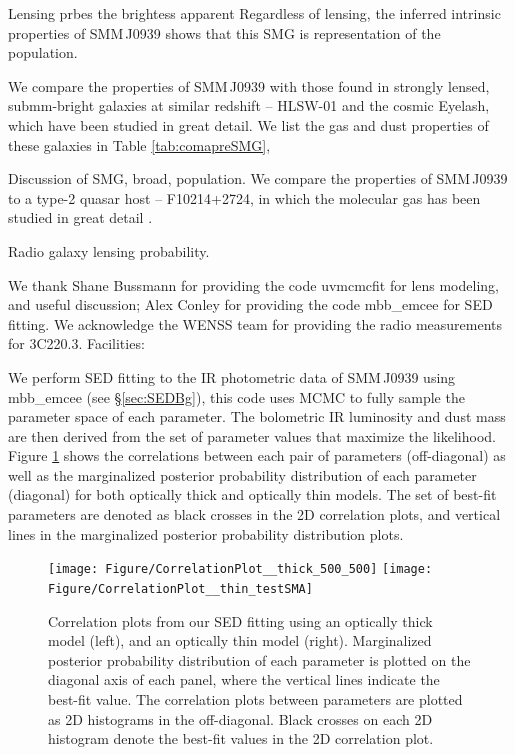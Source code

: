 \documentclass[twocolumn,apj,numberedappendix]{emulateapj}
\begin{document}
Lensing prbes the brightess apparent 
Regardless of lensing, the inferred intrinsic properties of SMM\,J0939 shows that this SMG is representation of the population.

We compare the properties of SMM\,J0939 with those found in strongly lensed, submm-bright galaxies at similar redshift -- HLSW-01 and the cosmic Eyelash, which have been studied in great detail. We list the gas and dust properties of these galaxies in Table \ref{tab:comapreSMG}, 


Discussion of SMG, broad, population.
We compare the properties of SMM\,J0939 to a type-2 quasar host -- F10214+2724, in which the molecular gas has been studied in great detail \citep{Riechers11a}.  

Radio galaxy lensing probability.

\acknowledgments
We thank Shane Bussmann for providing the code {\sc uvmcmcfit} for lens modeling, and useful discussion; Alex Conley for providing the code {\sc mbb\_emcee} for SED fitting. We acknowledge the WENSS team for providing the radio measurements for 3C220.3. 
Facilities: 




\appendix

We perform SED fitting to the IR photometric data of SMM\,J0939 using {\sc mbb\_emcee} (see \S \ref{sec:SEDBg}), this code uses MCMC to fully sample the parameter space of each parameter. The bolometric IR luminosity and dust mass are then derived from the set of parameter values that maximize the likelihood. Figure \ref{fig:sedlikelihood} shows the correlations between each pair of parameters (off-diagonal) as well as the marginalized posterior probability distribution of each parameter (diagonal) for both optically thick and optically thin models. The set of best-fit parameters are denoted as black crosses in the 2D correlation plots, and vertical lines in the marginalized posterior probability distribution plots. 

\begin{figure}[!tbph]
\centering
\texttt{[image: Figure/CorrelationPlot\_\_thick\_500\_500]}
\texttt{[image: Figure/CorrelationPlot\_\_thin\_testSMA]}
\caption{Correlation plots from our SED fitting using an optically thick
model (left), and an optically thin model (right). Marginalized posterior probability 
distribution of each
parameter is plotted on the diagonal axis of each panel, where the vertical lines indicate the best-fit value. The correlation plots between parameters are plotted as 2D histograms in the off-diagonal. Black crosses on each 2D histogram denote the 
best-fit values in 
the 2D correlation plot.
\label{fig:sedlikelihood}}
\end{figure}
\end{document}

